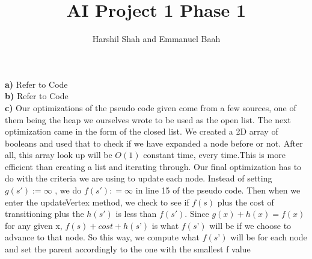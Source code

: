 \documentclass[11pt]{article}
\title{AI Project 1 Phase 1}
\author{Harshil Shah and Emmanuel Baah}
\date{}
\begin{document}
\maketitle 

\noindent \textbf{a)}	Refer to Code
\\
\textbf{b)}	Refer to Code
\\
\textbf{c)} Our optimizations of the pseudo code given come from a few sources, one of them being the heap we ourselves wrote to be used as the open list. The next optimization came in the form of the closed list. We created a 2D array of booleans and used that to check if we have expanded a node before or not. After all, this array look up will be $O(1)$ constant time, every time.This is more efficient than creating a list and iterating through. Our final optimization has to do with the criteria we are using to update each node. Instead of setting $g(s') := \infty$ , we do $f(s'): = \infty$ in line 15 of the pseudo code. Then when we enter the updateVertex method, we check to see if $f(s)$ plus the cost of transitioning plus the $h(s')$ is less than $f(s')$. Since $g(x) + h(x) = f(x)$ for any given x, $f(s) + cost + h(s’)$ is what $f(s’)$ will be if we choose to advance to that node. So this way, we compute what $f(s’)$ will be for each node and set the parent accordingly to the one with the smallest f value
\\
\end{document}
